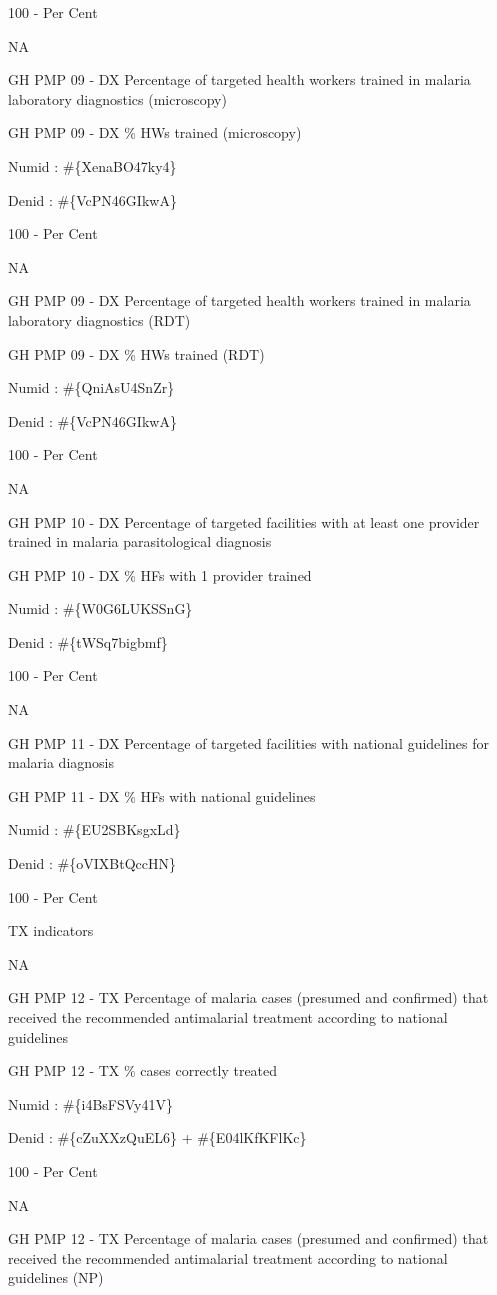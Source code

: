 \documentclass[]{book}
\begin{document}
100 - Per Cent

NA

GH PMP 09 - DX Percentage of targeted health workers trained in malaria laboratory diagnostics (microscopy)

GH PMP 09 - DX \% HWs trained (microscopy)

Numid : \#\{XenaBO47ky4\}

Denid : \#\{VcPN46GIkwA\}

100 - Per Cent

NA

GH PMP 09 - DX Percentage of targeted health workers trained in malaria laboratory diagnostics (RDT)

GH PMP 09 - DX \% HWs trained (RDT)

Numid : \#\{QniAsU4SnZr\}

Denid : \#\{VcPN46GIkwA\}

100 - Per Cent

NA

GH PMP 10 - DX Percentage of targeted facilities with at least one provider trained in malaria parasitological diagnosis

GH PMP 10 - DX \% HFs with 1 provider trained

Numid : \#\{W0G6LUKSSnG\}

Denid : \#\{tWSq7bigbmf\}

100 - Per Cent

NA

GH PMP 11 - DX Percentage of targeted facilities with national guidelines for malaria diagnosis

GH PMP 11 - DX \% HFs with national guidelines

Numid : \#\{EU2SBKsgxLd\}

Denid : \#\{oVIXBtQccHN\}

100 - Per Cent

TX indicators

NA

GH PMP 12 - TX Percentage of malaria cases (presumed and confirmed) that received the recommended antimalarial treatment according to national guidelines

GH PMP 12 - TX \% cases correctly treated

Numid : \#\{i4BsFSVy41V\}

Denid : \#\{cZuXXzQuEL6\} + \#\{E04lKfKFlKc\}

100 - Per Cent

NA

GH PMP 12 - TX Percentage of malaria cases (presumed and confirmed) that received the recommended antimalarial treatment according to national guidelines (NP)
\end{document}
